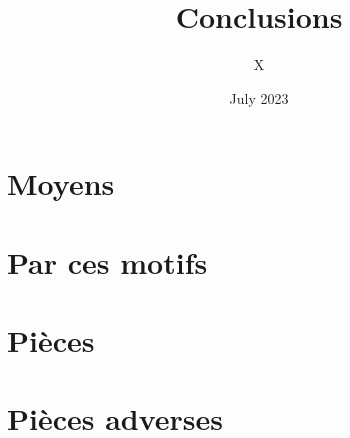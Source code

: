 \documentclass{report}
\title{Conclusions}
\author{X}
\date{July 2023}
\begin{document}
\maketitle


\section*{Moyens}
\begin{faits}
    
\end{faits}

\section*{Par ces motifs}
\begin{faits}[resume]%
  
\end{faits}


\section*{Pièces}
\begin{pieces}
    
\end{pieces}

\section*{Pièces adverses}
\begin{piecesAdverses}
    
\end{piecesAdverses}
\end{document}
